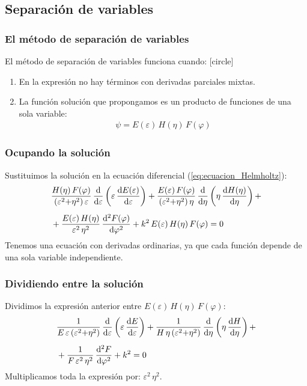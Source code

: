 \documentclass[12pt]{beamer}
\begin{document}
\subsection{Separación de variables}

\begin{frame}
\frametitle{El método de separación de variables}
El método de separación de variables funciona cuando:
\pause
{}
[circle]
\begin{enumerate}[<+->]
\item En la expresión no hay términos con derivadas parciales mixtas.
\item La función solución que propongamos es un producto de funciones de una sola variable:
\pause
\begin{align*}
\psi = E(\varepsilon) \, H(\eta) \, F(\varphi)
\end{align*}
\end{enumerate}
\end{frame}
\begin{frame}
\frametitle{Ocupando la solución}
Sustituimos la solución en la ecuación diferencial (\ref{eq:ecuacion_Helmholtz}):
\pause
\begin{align*}
&\dfrac{H(\eta) \, F(\varphi)}{(\varepsilon^{2} {+} \eta^{2}) \, \varepsilon} \, \dv{\varepsilon} \left( \varepsilon \, \dv{E(\varepsilon)}{\varepsilon} \right) + 
\dfrac{E(\varepsilon) \, F(\varphi)}{(\varepsilon^{2} {+} \eta^{2}) \, \eta} \, \dv{\eta} \left( \eta \, \dv{H(\eta)}{\eta} \right) + \\[0.5em]
&+ \dfrac{E(\varepsilon) \, H(\eta)}{\varepsilon^{2} \, \eta^{2}} \, \dv[2]{F(\varphi)}{\varphi} + k^{2} \, E(\varepsilon) \, H(\eta) \, F(\varphi) = 0
\end{align*}
\pause
Tenemos una ecuación con derivadas ordinarias, ya que cada función depende de una sola variable independiente.
\end{frame}
\begin{frame}
\frametitle{Dividiendo entre la solución}
Dividimos la expresión anterior entre $E(\varepsilon) \, H(\eta) \, F(\varphi)$:
\pause
\begin{align*}
&\dfrac{1}{E \, \varepsilon \, (\varepsilon^{2} {+} \eta^{2})} \, \dv{\varepsilon} \left( \varepsilon \, \dv{E}{\varepsilon} \right) + 
\dfrac{1}{H \, \eta \, (\varepsilon^{2} {+} \eta^{2})} \, \dv{\eta} \left( \eta \, \dv{H}{\eta} \right) + \\[0.5em]
&+ \dfrac{1}{ F \,  \varepsilon^{2} \, \eta^{2}} \, \dv[2]{F}{\varphi} + k^{2} = 0    
\end{align*}
\pause
Multiplicamos toda la expresión por: $\varepsilon^{2} \, \eta^{2}$.
\end{frame}
\end{document}
